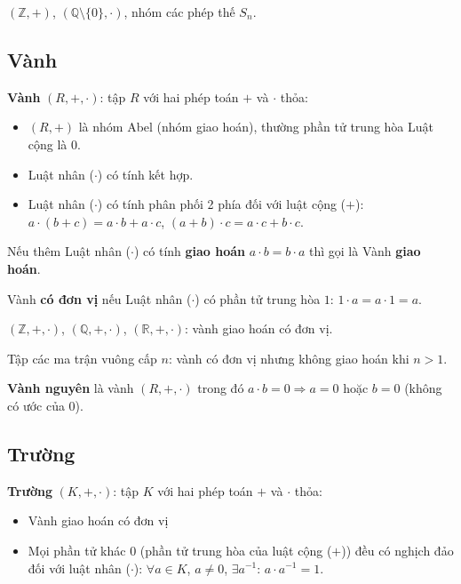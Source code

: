 \documentclass[12pt,a4paper]{article}
\begin{document}
\begin{vidu}
  $(\mathbb{Z}, +)$, $(\mathbb{Q} \setminus \{0\}, \cdot)$, nhóm các phép thế $S_n$.
\end{vidu}

\subsection{Vành}

\begin{dinhnghia}
  \textbf{Vành} $(R, +, \cdot)$: tập $R$ với hai phép toán $+$ và $\cdot$ thỏa:
  \begin{itemize}
    \item $(R, +)$ là nhóm Abel (nhóm giao hoán), thường phần tử trung hòa Luật cộng là $0$.
    \item Luật nhân ($\cdot$) có tính kết hợp.
    \item Luật nhân ($\cdot$) có tính phân phối 2 phía đối với luật cộng ($+$): $a \cdot (b + c) = a \cdot b + a \cdot c$, $(a + b) \cdot c = a \cdot c + b \cdot c$.
  \end{itemize}
  Nếu thêm Luật nhân ($\cdot$) có tính \textbf{giao hoán} $a \cdot b = b \cdot a$ thì gọi là Vành \textbf{giao hoán}.
  
  Vành \textbf{có đơn vị} nếu Luật nhân ($\cdot$) có phần tử trung hòa $1$: $1 \cdot a = a \cdot 1 = a$.
\end{dinhnghia}

\begin{vidu}
  $(\mathbb{Z}, +, \cdot)$, $(\mathbb{Q}, +, \cdot)$, $(\mathbb{R}, +, \cdot)$: vành giao hoán có đơn vị. 
  
  Tập các ma trận vuông cấp $n$: vành có đơn vị nhưng không giao hoán khi $n > 1$.
\end{vidu}

\begin{dinhnghia}
  \textbf{Vành nguyên} là vành $(R, +, \cdot)$ trong đó $a \cdot b = 0 \Rightarrow a = 0$ hoặc $b = 0$ (không có ước của 0).
\end{dinhnghia}

\subsection{Trường}

\begin{dinhnghia}
  \textbf{Trường} $(K, +, \cdot)$: tập $K$ với hai phép toán $+$ và $\cdot$ thỏa:
  \begin{itemize}
    \item Vành giao hoán có đơn vị
    \item Mọi phần tử khác $0$ (phần tử trung hòa của luật cộng ($+$)) đều có nghịch đảo đối với luật nhân ($\cdot$): $\forall a \in K$, $a \ne 0$, $\exists a^{-1}$: $a \cdot a^{-1} = 1$.
  \end{itemize}
\end{dinhnghia}
\end{document}
